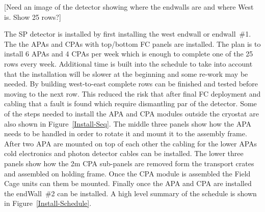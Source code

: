 [Need an image of the detector showing where the endwalls are and where West is. Show 25 rows?]

The SP detector is installed by
first installing the west endwall or endwall~\#1. The the APAs and
CPAs with top/bottom FC panels are installed. The plan is to install 6
APAs and 4 CPAs per week which is enough to complete one of the 25
rows every week. Additional time is built into the schedule to take
into account that the installation will be slower at the beginning and
some re-work may be needed. By building west-to-east complete rows can
be finished and tested before moving to the next row. This reduced the
risk that after final FC deployment and cabling that a fault is found
which require dismantling par of the detector. Some of the steps
needed to install the APA and CPA modules outside the cryostat are
also shown in Figure~\ref{Install-Seq}.  The middle three panels show
how the APA needs to be handled in order to rotate it and mount it to
the assembly frame. After two APA are mounted on top of each other the
cabling for the lower APAs cold electronics and photon detector cables
can be installed. The lower three panels show how the 2m CPA
sub-panels are removed form the transport crates and assembled on
holding frame. Once the CPA module is assembled the Field Cage units
can them be mounted. Finally once the APA and CPA are installed the
endWall~\#2 can be installed. A high level summary of the schedule is
shown in Figure~\ref{Install-Schedule}.
